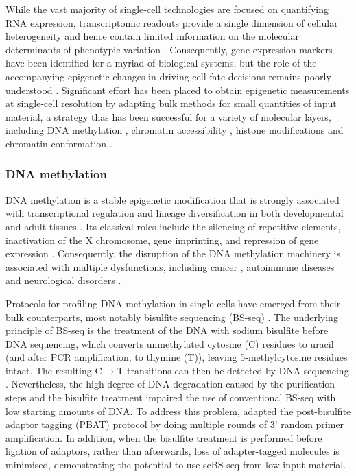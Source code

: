 While the vast majority of single-cell technologies are focused on quantifying RNA expression, transcriptomic readouts provide a single dimension of cellular heterogeneity and hence contain limited information on the molecular determinants of phenotypic variation \cite{Ritchie2015}. Consequently, gene expression markers have been identified for a myriad of biological systems, but the role of the accompanying epigenetic changes in driving cell fate decisions remains poorly understood \cite{Griffiths2018,Kelsey2017,Bheda2014}. Significant effort has been placed to obtain epigenetic measurements at single-cell resolution by adapting bulk methods for small quantities of input material, a strategy thas has been successful for a variety of molecular layers, including DNA methylation \cite{Smallwood2014}, chromatin accessibility \cite{Cusanovich2015,Cao2018,Chen2018}, histone modifications \cite{Ku2019} and chromatin conformation \cite{Ku2019}.

\subsubsection{DNA methylation} \label{section:dna_methylation}

DNA methylation is a stable epigenetic modification that is strongly associated with transcriptional regulation and lineage diversification in both developmental and adult tissues \cite{Jin2018, Harrison2011, Lee2014, Smith2013}. Its classical roles include the silencing of repetitive elements, inactivation of the X chromosome, gene imprinting, and repression of gene expression \cite{Jones2012}. Consequently, the disruption of the DNA methylation machinery is associated with multiple dysfunctions, including cancer \cite{Baylin2011}, autoimmune diseases \cite{Liu2013} and neurological disorders \cite{Amir1999}.

Protocols for profiling DNA methylation in single cells have emerged from their bulk counterparts, most notably bisulfite sequencing (BS-seq) \cite{Smallwood2014,Guo2013,Gravina2016,Farlik2015}. The underlying principle of BS-seq is the treatment of the DNA with sodium bisulfite before DNA sequencing, which converts unmethylated cytosine (C) residues to uracil (and after PCR amplification, to thymine (T)), leaving 5-methylcytosine residues intact. The resulting C$\to$T transitions can then be detected by DNA sequencing \cite{Frommer1992,Clark2016,Clark2017}. Nevertheless, the high degree of DNA degradation caused by the purification steps and the bisulfite treatment impaired the use of conventional BS-seq with low starting amounts of DNA. To address this problem, \cite{Smallwood2014} adapted the post-bisulfite adaptor tagging (PBAT) protocol by doing multiple rounds of 3' random primer amplification. In addition, when the bisulfite treatment is performed before ligation of adaptors, rather than afterwards, loss of adapter-tagged molecules is minimised, demonstrating the potential to use scBS-seq from low-input material. 

